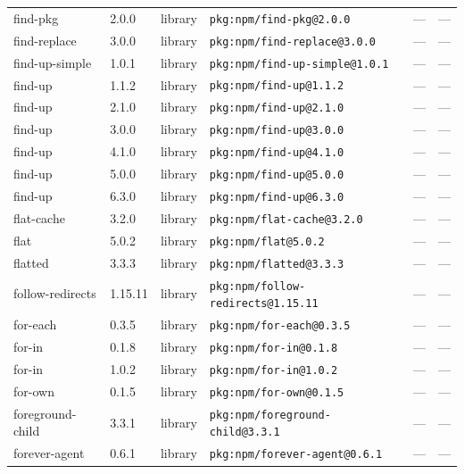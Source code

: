\documentclass[11pt,a4paper]{article}
\begin{document}
\begin{longtable}{|p{4cm}|p{2cm}|p{1.6cm}|p{5cm}|p{1.5cm}|p{3.5cm}|}
\raggedright find-pkg & 2.0.0 & library & \small\texttt{pkg:npm/find-pkg@2.0.0} & — & \small — \\
\raggedright find-replace & 3.0.0 & library & \small\texttt{pkg:npm/find-replace@3.0.0} & — & \small — \\
\raggedright find-up-simple & 1.0.1 & library & \small\texttt{pkg:npm/find-up-simple@1.0.1} & — & \small — \\
\raggedright find-up & 1.1.2 & library & \small\texttt{pkg:npm/find-up@1.1.2} & — & \small — \\
\raggedright find-up & 2.1.0 & library & \small\texttt{pkg:npm/find-up@2.1.0} & — & \small — \\
\raggedright find-up & 3.0.0 & library & \small\texttt{pkg:npm/find-up@3.0.0} & — & \small — \\
\raggedright find-up & 4.1.0 & library & \small\texttt{pkg:npm/find-up@4.1.0} & — & \small — \\
\raggedright find-up & 5.0.0 & library & \small\texttt{pkg:npm/find-up@5.0.0} & — & \small — \\
\raggedright find-up & 6.3.0 & library & \small\texttt{pkg:npm/find-up@6.3.0} & — & \small — \\
\raggedright flat-cache & 3.2.0 & library & \small\texttt{pkg:npm/flat-cache@3.2.0} & — & \small — \\
\raggedright flat & 5.0.2 & library & \small\texttt{pkg:npm/flat@5.0.2} & — & \small — \\
\raggedright flatted & 3.3.3 & library & \small\texttt{pkg:npm/flatted@3.3.3} & — & \small — \\
\raggedright follow-redirects & 1.15.11 & library & \small\texttt{pkg:npm/follow-redirects@1.15.11} & — & \small — \\
\raggedright for-each & 0.3.5 & library & \small\texttt{pkg:npm/for-each@0.3.5} & — & \small — \\
\raggedright for-in & 0.1.8 & library & \small\texttt{pkg:npm/for-in@0.1.8} & — & \small — \\
\raggedright for-in & 1.0.2 & library & \small\texttt{pkg:npm/for-in@1.0.2} & — & \small — \\
\raggedright for-own & 0.1.5 & library & \small\texttt{pkg:npm/for-own@0.1.5} & — & \small — \\
\raggedright foreground-child & 3.3.1 & library & \small\texttt{pkg:npm/foreground-child@3.3.1} & — & \small — \\
\raggedright forever-agent & 0.6.1 & library & \small\texttt{pkg:npm/forever-agent@0.6.1} & — & \small — \\

\end{longtable}
\end{document}
